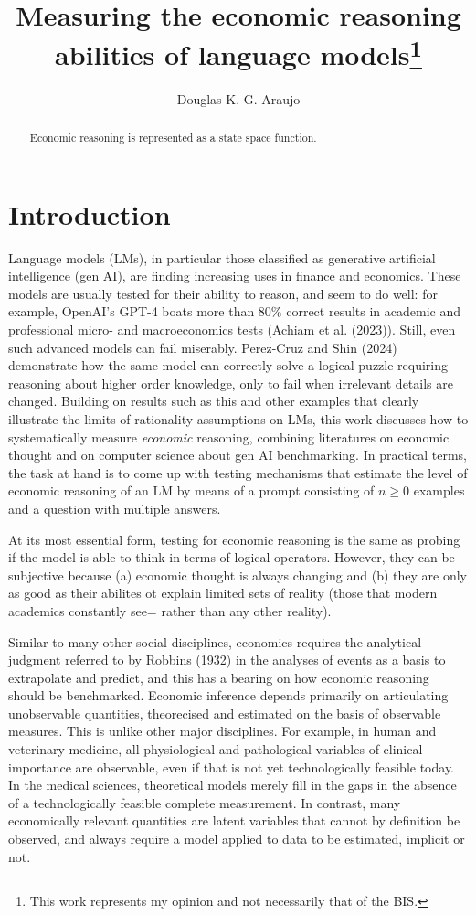 \documentclass[
]{article}
\title{Measuring the economic reasoning abilities of language
models\thanks{This work represents my opinion and not necessarily that
of the BIS.}}
\author{Douglas K. G. Araujo}
\affil{%
                  Bank for International
Settlements, douglas.araujo@bis.org
              }
\date{}
\begin{document}
\maketitle
\begin{abstract}
Economic reasoning is represented as a state space function.
\end{abstract}

\section{Introduction}\label{introduction}

Language models (LMs), in particular those classified as generative
artificial intelligence (gen AI), are finding increasing uses in finance
and economics. These models are usually tested for their ability to
reason, and seem to do well: for example, OpenAI's GPT-4 boats more than
80\% correct results in academic and professional micro- and
macroeconomics tests (Achiam et al. (2023)). Still, even such advanced
models can fail miserably. Perez-Cruz and Shin (2024) demonstrate how
the same model can correctly solve a logical puzzle requiring reasoning
about higher order knowledge, only to fail when irrelevant details are
changed. Building on results such as this and other examples that
clearly illustrate the limits of rationality assumptions on LMs, this
work discusses how to systematically measure \emph{economic} reasoning,
combining literatures on economic thought and on computer science about
gen AI benchmarking. In practical terms, the task at hand is to come up
with testing mechanisms that estimate the level of economic reasoning of
an LM by means of a prompt consisting of \(n \geq 0\) examples and a
question with multiple answers.

At its most essential form, testing for economic reasoning is the same
as probing if the model is able to think in terms of logical operators.
However, they can be subjective because (a) economic thought is always
changing and (b) they are only as good as their abilites ot explain
limited sets of reality (those that modern academics constantly see=
rather than any other reality).

Similar to many other social disciplines, economics requires the
analytical judgment referred to by Robbins (1932) in the analyses of
events as a basis to extrapolate and predict, and this has a bearing on
how economic reasoning should be benchmarked. Economic inference depends
primarily on articulating unobservable quantities, theorecised and
estimated on the basis of observable measures. This is unlike other
major disciplines. For example, in human and veterinary medicine, all
physiological and pathological variables of clinical importance are
observable, even if that is not yet technologically feasible today. In
the medical sciences, theoretical models merely fill in the gaps in the
absence of a technologically feasible complete measurement. In contrast,
many economically relevant quantities are latent variables that cannot
by definition be observed, and always require a model applied to data to
be estimated, implicit or not.
\end{document}
